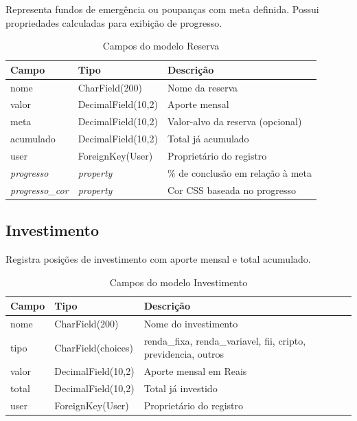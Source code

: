 \documentclass[12pt, a4paper, oneside]{report}
\begin{document}
Representa fundos de emergência ou poupanças com meta definida. Possui propriedades calculadas para exibição de progresso.

\begin{table}[H]
\centering
\caption{Campos do modelo Reserva}
\begin{tabularx}{\textwidth}{>{\ttfamily}l l X}
\toprule
Campo & Tipo & Descrição \\
\midrule
nome & CharField(200) & Nome da reserva \\
valor & DecimalField(10,2) & Aporte mensal \\
meta & DecimalField(10,2) & Valor-alvo da reserva (opcional) \\
acumulado & DecimalField(10,2) & Total já acumulado \\
user & ForeignKey(User) & Proprietário do registro \\
\textit{progresso} & \textit{property} & \% de conclusão em relação à meta \\
\textit{progresso\_cor} & \textit{property} & Cor CSS baseada no progresso \\
\bottomrule
\end{tabularx}
\end{table}

\subsection{Investimento}

Registra posições de investimento com aporte mensal e total acumulado.

\begin{table}[H]
\centering
\caption{Campos do modelo Investimento}
\begin{tabularx}{\textwidth}{>{\ttfamily}l l X}
\toprule
Campo & Tipo & Descrição \\
\midrule
nome & CharField(200) & Nome do investimento \\
tipo & CharField(choices) & renda\_fixa, renda\_variavel, fii, cripto, previdencia, outros \\
valor & DecimalField(10,2) & Aporte mensal em Reais \\
total & DecimalField(10,2) & Total já investido \\
user & ForeignKey(User) & Proprietário do registro \\
\bottomrule
\end{tabularx}
\end{table}

\end{document}
